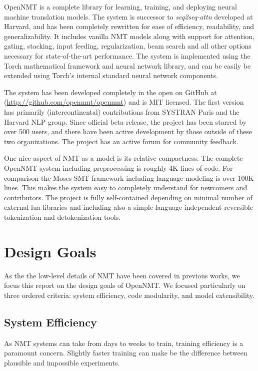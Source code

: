 \documentclass[11pt]{article}
\begin{document}
OpenNMT is a complete library for learning, training, and
deploying neural machine translation models. The system is successor
to  \textit{seq2seq-attn} developed at Harvard, and has been completely rewritten for ease of efficiency, readability, and generalizability. It includes 
vanilla NMT models along with support for attention, gating, stacking,
input feeding, regularization, beam search and all other options necessary
for state-of-the-art performance.  
The system is implemented using the Torch mathematical framework and
neural network library, and can be easily be extended using Torch's
internal standard neural network components. 

The system has been developed completely in the open on GitHub at
(\url{http://github.com/opennmt/opennmt}) and is MIT licensed.  The
first version has primarily (intercontinental) contributions from
SYSTRAN Paris and the Harvard NLP group. Since official beta release,
the project has been starred by over 500 users, and there have been
active development by those outside of these two organizations. The
project has an active forum for community feedback.


One nice aspect of NMT as a model is its relative compactness. The
complete OpenNMT system including preprocessing is roughly 4K lines of
code. For comparison the Moses SMT framework including language
modeling is over 100K lines. This makes the system easy to completely
understand for newcomers and contributors. The project is fully self-contained
depending on minimal number of external lua libraries and including also a simple
 language independent reversible tokenization and detokenization tools.



\section{Design Goals}


As the the low-level details of NMT have been covered in previous
works, we focus this report on the design goals of
OpenNMT. We focused particularly on three ordered criteria:
system efficiency, code modularity, and model extensibility. 

\subsection{System Efficiency}

As NMT systems can take from days to weeks to train, training
efficiency is a paramount concern. Slightly faster training can make be the difference between
plausible and impossible experiments.
\end{document}
